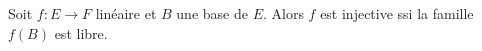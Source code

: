 Soit $f : E \to F$ linéaire et $B$  une base de $E$. Alors $f$ est injective ssi la famille $f(B)$ est libre.

\begin{reponses}
\end{reponses}

